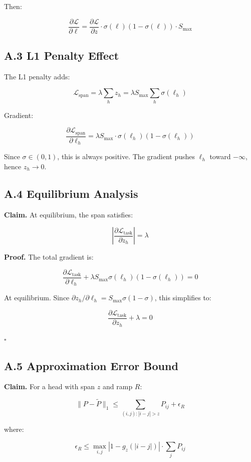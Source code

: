 Then:

\[
\frac{\partial \mathcal{L}}{\partial \ell} = \frac{\partial \mathcal{L}}{\partial z} \cdot \sigma(\ell)(1 - \sigma(\ell)) \cdot S_\text{max}
\]

\subsection{A.3 L1 Penalty Effect}

The L1 penalty adds:

\[
\mathcal{L}_\text{span} = \lambda \sum_h z_h = \lambda S_\text{max} \sum_h \sigma(\ell_h)
\]

Gradient:

\[
\frac{\partial \mathcal{L}_\text{span}}{\partial \ell_h} = \lambda S_\text{max} \cdot \sigma(\ell_h)(1 - \sigma(\ell_h))
\]

Since $\sigma \in (0, 1)$, this is always positive. The gradient pushes 
$\ell_h$ toward $-\infty$, hence $z_h \to 0$.

\subsection{A.4 Equilibrium Analysis}

\textbf{Claim.} At equilibrium, the span satisfies:

\[
\left|\frac{\partial \mathcal{L}_\text{task}}{\partial z_h}\right| = \lambda
\]

\textbf{Proof.} The total gradient is:

\[
\frac{\partial \mathcal{L}_\text{task}}{\partial \ell_h} + \lambda S_\text{max} \sigma(\ell_h)(1 - \sigma(\ell_h)) = 0
\]

At equilibrium. Since $\partial z_h / \partial \ell_h = S_\text{max} \sigma(1-\sigma)$, 
this simplifies to:

\[
\frac{\partial \mathcal{L}_\text{task}}{\partial z_h} + \lambda = 0
\]

$\square$

\subsection{A.5 Approximation Error Bound}

\textbf{Claim.} For a head with span $z$ and ramp $R$:

\[
\|P - \tilde{P}\|_1 \leq \sum_{(i,j): |i-j| > z} P_{ij} + \epsilon_R
\]

where:

\[
\epsilon_R \leq \max_{i,j} |1 - g_z(|i-j|)| \cdot \sum_j P_{ij}
\]

